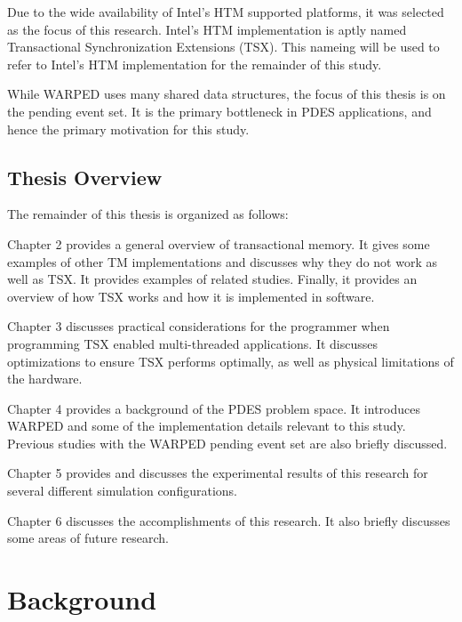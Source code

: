 \documentclass[a4paper]{article}
\begin{document}
\indent
Due to the wide availability of Intel's HTM supported platforms, it was
selected as the focus of this research.  Intel's HTM implementation is aptly
named Transactional Synchronization Extensions (TSX).  This nameing will be used
to refer to Intel's HTM implementation for the remainder of this study.
\par

\indent 
While WARPED uses many shared data structures, the focus of this thesis
is on the pending event set.  It is the primary bottleneck in PDES applications,
and hence the primary motivation for this study.
\par

\subsection{\textbf{Thesis Overview}}

The remainder of this thesis is organized as follows:
\par

\indent 
Chapter 2 provides a general overview of transactional memory.  It gives
some examples of other TM implementations and discusses why they do not work as
well as TSX.  It provides examples of related studies.  Finally, it provides an
overview of how TSX works and how it is implemented in software.
\par

\indent
Chapter 3 discusses practical considerations for the programmer when programming
TSX enabled multi-threaded applications.  It discusses optimizations to ensure
TSX performs optimally, as well as physical limitations of the hardware.
\par

\indent
Chapter 4 provides a background of the PDES problem space.  It introduces
WARPED and some of the implementation details relevant to this study. Previous
studies with the WARPED pending event set are also briefly discussed.
\par

\indent
Chapter 5 provides and discusses the experimental results of this research for
several different simulation configurations.
\par

\indent
Chapter 6 discusses the accomplishments of this research.  It also briefly
discusses some areas of future research.
\par

\newpage

\section{\textbf{Background}}
\end{document}
